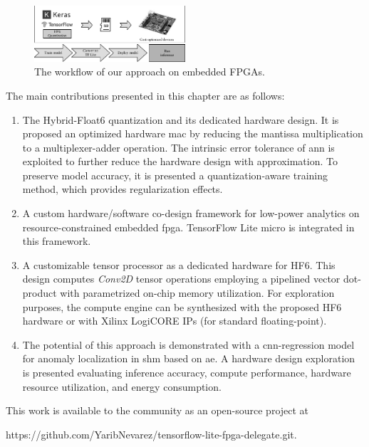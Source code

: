 \begin{figure}[t!]
	\centering
	\includegraphics[width=0.5\textwidth]{./chapters/cnn_accelerator/figures/workflow.pdf}
	\caption{The workflow of our approach on embedded FPGAs.}
	\label{fig:workflow}
\end{figure}

The main contributions presented in this chapter are as follows:
\begin{enumerate}
	\item
	
	The Hybrid-Float6 quantization and its dedicated hardware design. It is proposed an optimized hardware \gls{mac} by reducing the mantissa multiplication to a multiplexer-adder operation. The intrinsic error tolerance of \gls{ann} is exploited to further reduce the hardware design with approximation. To preserve model accuracy, it is presented a quantization-aware training method, which provides regularization effects.
	
	\item A custom hardware/software co-design framework for low-power analytics on resource-constrained embedded \gls{fpga}. TensorFlow Lite micro is integrated in this framework.
	\item A customizable tensor processor as a dedicated hardware for HF6. This design computes \emph{Conv2D} tensor operations employing a pipelined vector dot-product with parametrized on-chip memory utilization. For exploration purposes, the compute engine can be synthesized with the proposed HF6 hardware or with Xilinx LogiCORE IPs (for standard floating-point).
	\item The potential of this approach is demonstrated with a \gls{cnn}-regression model for anomaly localization in \gls{shm} based on \gls{ae}. A hardware design exploration is presented evaluating inference accuracy, compute performance, hardware resource utilization, and energy consumption.
\end{enumerate}

This work is available to the community as an open-source project at

https://github.com/YaribNevarez/tensorflow-lite-fpga-delegate.git.